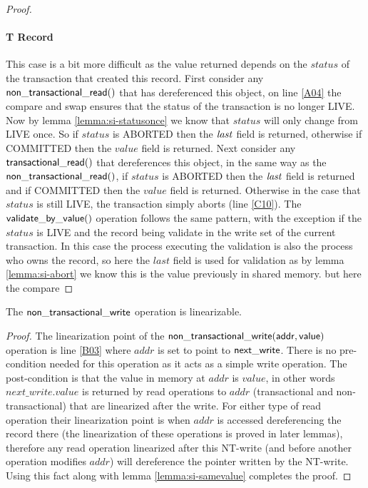 \begin{proof}
\paragraph{T Record} This case is a bit more difficult as the value returned depends on the $\mathit{status}$ of the transaction
that created this record.
First consider any $\sf{non\_transactional\_read}()$ that has dereferenced this object, on line \ref{A04} the compare and swap ensures that the status of the transaction is
no longer LIVE.
Now by lemma \ref{lemma:si-statusonce} we know that $\mathit{status}$ will only change from LIVE once.
So if $\mathit{status}$ is ABORTED then the $\ms{last}$ field is returned, otherwise if COMMITTED then the $\mathit{value}$ field is returned.
Next consider any $\sf{transactional\_read}()$ that dereferences this object, in the same way as the $\sf{non\_transactional\_read}()$, if
$\mathit{status}$ is ABORTED then the $\ms{last}$ field is returned and if COMMITTED then the $\mathit{value}$ field is returned.
Otherwise in the case that $\mathit{status}$ is still LIVE, the transaction simply aborts (line \ref{C10}).
The $\sf{validate\_by\_value}()$ operation follows the same pattern, with the exception if the $\mathit{status}$ is LIVE and
the record being validate in the write set of the current transaction.
In this case the process executing the validation is also the process who owns the record,
so here the $\mathit{last}$ field is used for validation as by lemma \ref{lemma:si-abort} we know this is the value previously
in shared memory.
 but here the compare
\end{proof}




\begin{lemma}
\label{lemma:si-ntwrite}
The $\sf{non\_transactional\_write}$ operation is linearizable.
\end{lemma}
\begin{proof}
The linearization point of the $\sf{non\_transactional\_write}(addr,value)$ operation
is line \ref{B03} where $\mathit{addr}$ is set to point to $\sf{next\_write}$.
There is no pre-condition needed for this operation as it acts as a simple write operation.
The post-condition is that the value in memory at $\mathit{addr}$ is $\mathit{value}$, in other words $\mathit{next\_write.value}$ is returned by 
read operations to $\mathit{addr}$ (transactional and non-transactional) that are linearized after the write.
For either type of read operation their linearization point is when $\mathit{addr}$ is accessed dereferencing the record there
(the linearization of these operations is proved in later lemmas),
therefore any read operation linearized after this NT-write (and before another operation modifies $\mathit{addr}$)
will dereference the pointer written by the NT-write.
Using this fact along with lemma \ref{lemma:si-samevalue} completes the proof.
\end{proof}


